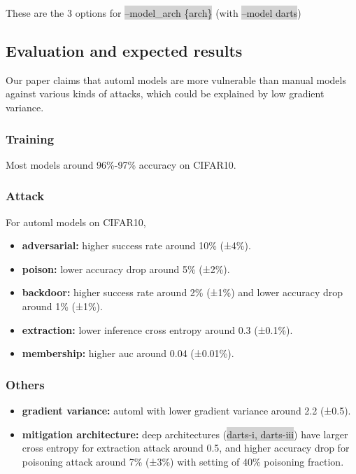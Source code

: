 \documentclass[letterpaper,twocolumn,10pt]{article}
\begin{document}
{{{{{These are the 3 options for \colorbox{lightgray}{--model\_arch \{arch\}} (with \colorbox{lightgray}{--model darts})

\subsection{Evaluation and expected results}

Our paper claims that automl models are more vulnerable than manual models against various kinds of attacks, which could be explained by low gradient variance. 
\subsubsection*{Training}
Most models around 96\%-97\% accuracy on CIFAR10.
\subsubsection*{Attack}
For automl models on CIFAR10,

{\small
\begin{itemize}
    \item {\bf adversarial: } higher success rate around 10\% (±4\%).
    \item {\bf poison: } lower accuracy drop around 5\% (±2\%).
    \item {\bf backdoor: } higher success rate around 2\% (±1\%) and lower accuracy drop around 1\% (±1\%).
    \item {\bf extraction: } lower inference cross entropy around 0.3 (±0.1\%).
    \item {\bf membership: } higher auc around 0.04 (±0.01\%).
\end{itemize}

\subsubsection*{Others}

{\small
\begin{itemize}
    \item {\bf gradient variance: } automl with lower gradient variance around 2.2 (±0.5).
    \item {\bf mitigation architecture: } deep architectures (\colorbox{lightgray}{darts-i, darts-iii}) have larger cross entropy for extraction attack around 0.5, and higher accuracy drop for poisoning attack around 7\% (±3\%) with setting of 40\% poisoning fraction.
\end{itemize}

}}}}}}}
\end{document}
